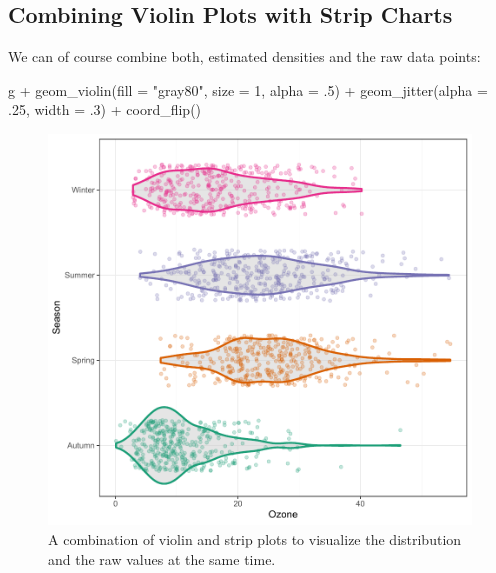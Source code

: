 \documentclass[
]{krantz}
\makeatletter
\newenvironment{Shaded}{\begin{snugshade}}{\end{snugshade}}
\newcommand{\AttributeTok}[1]{\textcolor[rgb]{0.61,0.61,0.61}{#1}}
\newcommand{\DecValTok}[1]{\textcolor[rgb]{0.06,0.06,0.06}{#1}}
\newcommand{\FunctionTok}[1]{\textcolor[rgb]{0,0,0}{#1}}
\newcommand{\NormalTok}[1]{#1}
\newcommand{\SpecialCharTok}[1]{\textcolor[rgb]{0,0,0}{#1}}
\newcommand{\StringTok}[1]{\textcolor[rgb]{0.5,0.5,0.5}{#1}}
\newenvironment{kframe}{%
\medskip{}
\setlength{\fboxsep}{.8em}
 \def\at@end@of@kframe{}%
 \ifinner\ifhmode%
  \def\at@end@of@kframe{\end{minipage}}%
  \begin{minipage}{\columnwidth}%
 \fi\fi%
 \def\FrameCommand##1{\hskip\@totalleftmargin \hskip-\fboxsep
 \colorbox{shadecolor}{##1}\hskip-\fboxsep
     \hskip-\linewidth \hskip-\@totalleftmargin \hskip\columnwidth}%
 \MakeFramed {\advance\hsize-\width
   \@totalleftmargin\z@ \linewidth\hsize
   \@setminipage}}%
 {\par\unskip\endMakeFramed%
 \at@end@of@kframe}
\renewenvironment{Shaded}{\begin{kframe}}{\end{kframe}}
\makeatother
\begin{document}
\hypertarget{combining-violin-plots-with-strip-charts}{%
\subsection{Combining Violin Plots with Strip Charts}\label{combining-violin-plots-with-strip-charts}}

We can of course combine both, estimated densities and the raw data points:

\begin{Shaded}
\begin{Highlighting}[]
\NormalTok{g }\SpecialCharTok{+} \FunctionTok{geom\_violin}\NormalTok{(}\AttributeTok{fill =} \StringTok{"gray80"}\NormalTok{, }\AttributeTok{size =} \DecValTok{1}\NormalTok{, }\AttributeTok{alpha =}\NormalTok{ .}\DecValTok{5}\NormalTok{) }\SpecialCharTok{+}
    \FunctionTok{geom\_jitter}\NormalTok{(}\AttributeTok{alpha =}\NormalTok{ .}\DecValTok{25}\NormalTok{, }\AttributeTok{width =}\NormalTok{ .}\DecValTok{3}\NormalTok{) }\SpecialCharTok{+}
    \FunctionTok{coord\_flip}\NormalTok{()}
\end{Highlighting}
\end{Shaded}

\begin{figure}
\centering
\includegraphics{bookdown_files/figure-latex/violin-jitter-1.pdf}
\caption{\label{fig:violin-jitter}A combination of violin and strip plots to visualize the distribution and the raw values at the same time.}
\end{figure}
\end{document}
